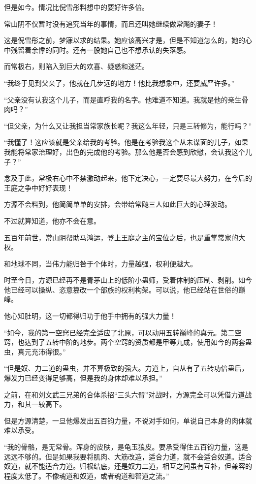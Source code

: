 \begin{this_body}
但是如今。情况比倪雪彤料想中的要好许多倍。

常山阴不仅暂时没有追究当年的事情，而且还叫她继续做常飚的妻子！

这是倪雪彤之前，梦寐以求的结果。她应该高兴才是，但是不知道怎么的，她的心中残留着余悸的同时。还有一股她自己也不想承认的失落感。

而常极右，则陷入到巨大的欢喜、疑惑和迷茫。

“我终于见到父亲了，他就在几步远的地方！他比我想象中，还要威严许多。”

“父亲没有认我这个儿子，而是直呼我的名字。他难道不知道。我就是他的亲生骨肉吗？”

“但父亲，为什么又让我担当常家族长呢？我这么年轻，只是三转修为，能行吗？”

“我懂了！这应该就是父亲给我的考验。他是在考验我这个从未谋面的儿子，如果我能将常家治理好，出色的完成他的考验。那么他是否会感到欣慰，会认我这个儿子？”

念及于此，常极右心中不禁激动起来，他下定决心，一定要尽最大努力，在今后的王庭之争中好好表现！

方源不会料到，他简简单单的安排，会带给常飚三人如此巨大的心理波动。

不过就算知道，他亦不会在意。

五百年前世，常山阴帮助马鸿运，登上王庭之主的宝位之后，也是重掌常家的大权。

和地球不同，当伟力能归咎于个体时，力量越强，权利便越大。

时至今日，方源已经再不是青茅山上的低阶小蛊师，受着体制的压制、剥削。如今他已经可以操纵、恣意篡改一个部族的权利构架。可以说，他已经站在世俗的巅峰。

他心知肚明，这一切都得归功于他手中拥有的强大力量！

“如今，我的第一空窍已经完全适应了北原，可以动用五转巅峰的真元。第二空窍，也达到了五转中阶的地步。两个空窍的资质都是甲等九成，使用如今的两套蛊虫，真元充沛得很。”

“但是奴、力二道的蛊虫，并不算极致的强大。力道上，自从有了五转功倍蛊后，爆发力已经变得足够高，但是我的身体却难以承担。”

之前，在和刘文武三兄弟的合体杀招“三头六臂”对战时，方源完全可以凭借力道战力，和其一较高下。

但是方源清楚，一旦他爆发出五百钧力量，不说对手如何，单说自己本身的肉体就难以承受。

“我的骨骼，是无常骨。浑身的皮肤，是龟玉狼皮。要承受得住五百钧力量，这是远远不够的。但是如果我要将肌肉、大筋改造，适合力道，就不会适合奴道。适合奴道，就不能适合力道。归根结底，还是奴力二道，相互之间虽有互补，但兼容的程度太低了。不像魂道和奴道，或者魂道和智道之流。”


\end{this_body}
